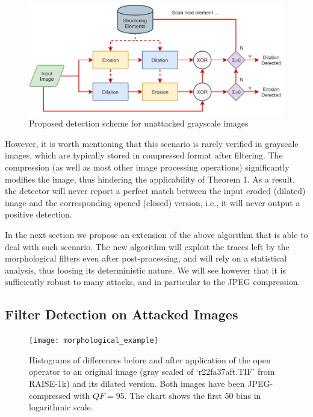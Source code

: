 \documentclass[review]{elsarticle}
\begin{document}
\begin{figure}[!ht]
	\centering
	\includegraphics[width=\linewidth]{diagram1}
	\caption{Proposed detection scheme for unattacked grayscale images}
	\label{fig:scheme}
\end{figure}

However, it is worth mentioning that this scenario is rarely verified in grayscale images, which are typically stored in compressed format after filtering. The compression (as well as most other image processing operations) significantly modifies the image, thus hindering the applicability of Theorem 1. As a result, the detector will never report a perfect match between the input eroded (dilated) image and the corresponding opened (closed) version, i.e., it will never output a positive detection.

In the next section we propose an extension of the above algorithm that is able to deal with such scenario. The new algorithm will exploit the traces left by the morphological filters even after post-processing, and will rely on a statistical analysis, thus loosing its deterministic nature. We will see however that it is sufficiently robust to many attacks, and in particular to the JPEG compression.

\subsection{Filter Detection on Attacked Images}
\label{sec:compr_img}
\begin{figure}[!ht]%
	\centering
	\texttt{[image: morphological\_example]}
	\caption{Histograms of differences before and after application of the open operator to an original image (gray scaled of `r22fa37aft.TIF' from RAISE-1k) and its dilated version. Both images have been JPEG-compressed with $QF = 95$. The chart shows the first 50 bins in logarithmic scale. }
	\label{fig:hist_ero}
\end{figure}
\end{document}
